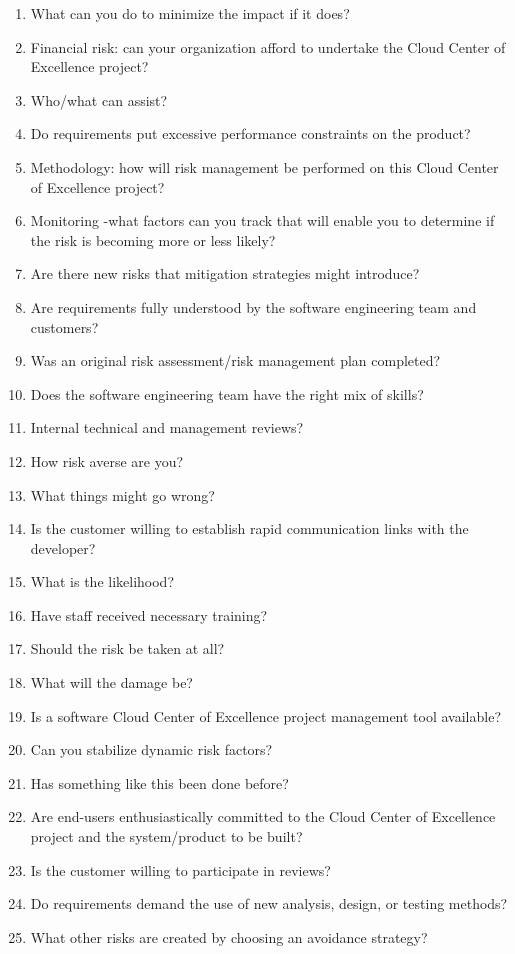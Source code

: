 \documentclass[10pt,letterpaper]{article}
\begin{document}
\begingroup\small\begin{enumerate}[leftmargin=2.1em, itemsep=4pt]
\item[1.] What can you do to minimize the impact if it does?
\item[2.] Financial risk: can your organization afford to undertake the Cloud Center of Excellence project?
\item[3.] Who/what can assist?
\item[4.] Do requirements put excessive performance constraints on the product?
\item[5.] Methodology: how will risk management be performed on this Cloud Center of Excellence project?
\item[6.] Monitoring -what factors can you track that will enable you to determine if the risk is becoming more or less likely?
\item[7.] Are there new risks that mitigation strategies might introduce?
\item[8.] Are requirements fully understood by the software engineering team and customers?
\item[9.] Was an original risk assessment/risk management plan completed?
\item[10.] Does the software engineering team have the right mix of skills?
\item[11.] Internal technical and management reviews?
\item[12.] How risk averse are you?
\item[13.] What things might go wrong?
\item[14.] Is the customer willing to establish rapid communication links with the developer?
\item[15.] What is the likelihood?
\item[16.] Have staff received necessary training?
\item[17.] Should the risk be taken at all?
\item[18.] What will the damage be?
\item[19.] Is a software Cloud Center of Excellence project management tool available?
\item[20.] Can you stabilize dynamic risk factors?
\item[21.] Has something like this been done before?
\item[22.] Are end-users enthusiastically committed to the Cloud Center of Excellence project and the system/product to be built?
\item[23.] Is the customer willing to participate in reviews?
\item[24.] Do requirements demand the use of new analysis, design, or testing methods?
\item[25.] What other risks are created by choosing an avoidance strategy?
\end{enumerate}\endgroup
\end{document}

